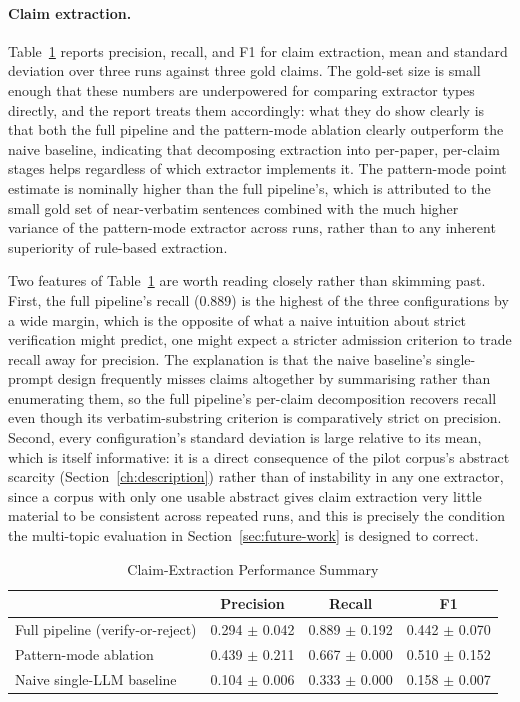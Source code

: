 \documentclass[12pt,a4paper]{report}
\newcommand{\headrow}{\rowcolor{navy}}
\newcommand{\hd}[1]{{\color{white}\bfseries #1}}
\begin{document}
\paragraph{Claim extraction.}
Table~\ref{tab:claims} reports precision, recall, and F1 for claim extraction,
mean and standard deviation over three runs against three gold claims. The
gold-set size is small enough that these numbers are underpowered for
comparing extractor types directly, and the report treats them accordingly:
what they do show clearly is that both the full pipeline and the pattern-mode
ablation clearly outperform the naive baseline, indicating that decomposing
extraction into per-paper, per-claim stages helps regardless of which
extractor implements it. The pattern-mode point estimate is nominally higher
than the full pipeline's, which is attributed to the small gold set of
near-verbatim sentences combined with the much higher variance of the
pattern-mode extractor across runs, rather than to any inherent superiority of
rule-based extraction.

Two features of Table~\ref{tab:claims} are worth reading closely rather than
skimming past. First, the full pipeline's recall (0.889) is the highest of
the three configurations by a wide margin, which is the opposite of what a
naive intuition about strict verification might predict, one might expect a
stricter admission criterion to trade recall away for precision. The
explanation is that the naive baseline's single-prompt design frequently
misses claims altogether by summarising rather than enumerating them, so the
full pipeline's per-claim decomposition recovers recall even though its
verbatim-substring criterion is comparatively strict on precision. Second,
every configuration's standard deviation is large relative to its mean, which
is itself informative: it is a direct consequence of the pilot corpus's
abstract scarcity (Section~\ref{ch:description}) rather than of instability in
any one extractor, since a corpus with only one usable abstract gives claim
extraction very little material to be consistent across repeated runs, and
this is precisely the condition the multi-topic evaluation in
Section~\ref{sec:future-work} is designed to correct.

\begin{table}[H]
\centering
\caption{Claim-Extraction Performance Summary}
\label{tab:claims}
\begin{tabular}{@{}lccc@{}}
\toprule
\headrow \hd{Configuration} & \hd{Precision} & \hd{Recall} & \hd{F1} \\
\midrule
Full pipeline (verify-or-reject) & 0.294 $\pm$ 0.042 & 0.889 $\pm$ 0.192 & 0.442 $\pm$ 0.070 \\
Pattern-mode ablation & 0.439 $\pm$ 0.211 & 0.667 $\pm$ 0.000 & 0.510 $\pm$ 0.152 \\
Naive single-LLM baseline & 0.104 $\pm$ 0.006 & 0.333 $\pm$ 0.000 & 0.158 $\pm$ 0.007 \\
\bottomrule
\end{tabular}
\end{table}
\end{document}
